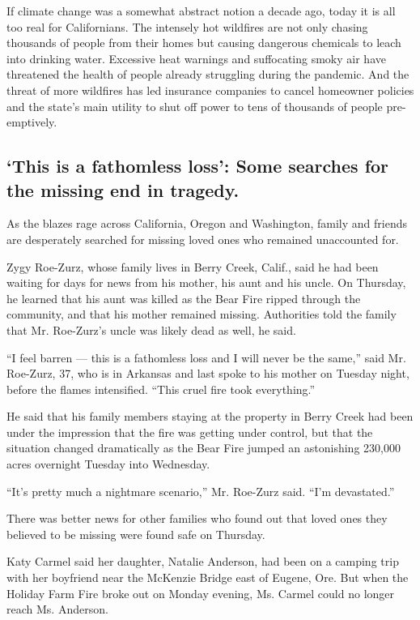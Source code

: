 If climate change was a somewhat abstract notion a decade ago, today it
is all too real for Californians. The intensely hot wildfires are not
only chasing thousands of people from their homes but causing dangerous
chemicals to leach into drinking water. Excessive heat warnings and
suffocating smoky air have threatened the health of people already
struggling during the pandemic. And the threat of more wildfires has led
insurance companies to cancel homeowner policies and the state's main
utility to shut off power to tens of thousands of people pre-emptively.

\hypertarget{this-is-a-fathomless-loss-some-searches-for-the-missing-end-in-tragedy}{%
\subsection{`This is a fathomless loss': Some searches for the missing
end in
tragedy.}\label{this-is-a-fathomless-loss-some-searches-for-the-missing-end-in-tragedy}}

As the blazes rage across California, Oregon and Washington, family and
friends are desperately searched for missing loved ones who remained
unaccounted for.

Zygy Roe-Zurz, whose family lives in Berry Creek, Calif., said he had
been waiting for days for news from his mother, his aunt and his uncle.
On Thursday, he learned that his aunt was killed as the Bear Fire ripped
through the community, and that his mother remained missing. Authorities
told the family that Mr. Roe-Zurz's uncle was likely dead as well, he
said.

``I feel barren --- this is a fathomless loss and I will never be the
same,'' said Mr. Roe-Zurz, 37, who is in Arkansas and last spoke to his
mother on Tuesday night, before the flames intensified. ``This cruel
fire took everything.''

He said that his family members staying at the property in Berry Creek
had been under the impression that the fire was getting under control,
but that the situation changed dramatically as the Bear Fire jumped an
astonishing 230,000 acres overnight Tuesday into Wednesday.

``It's pretty much a nightmare scenario,'' Mr. Roe-Zurz said. ``I'm
devastated.''

There was better news for other families who found out that loved ones
they believed to be missing were found safe on Thursday.

Katy Carmel said her daughter, Natalie Anderson, had been on a camping
trip with her boyfriend near the McKenzie Bridge east of Eugene, Ore.
But when the Holiday Farm Fire broke out on Monday evening, Ms. Carmel
could no longer reach Ms. Anderson.

